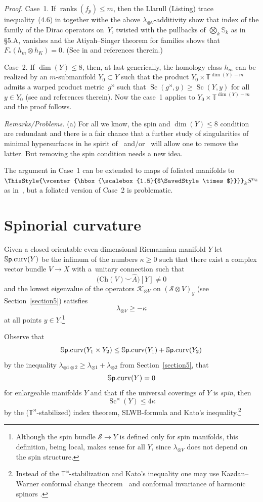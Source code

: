 \documentclass[10pt,a4paper]{amsart}
\numberwithin{equation}{section}
\newcommand\bigtimes{\mathbin{\ThisStyle{\vcenter{\hbox{%
\scalebox{1.5}{$\SavedStyle\times$}}}}}}
\begin{document}
 {\it Proof.} Case~1. If $\operatorname{ranks}(f_p)\leq m$, then the Llarull (Listing) trace inequality~(4.6) in \cite{Ll1998} together withe the above $\lambda_{\otimes V}$-additivity show that index of the family of the Dirac operators on~$Y$, twisted with the pullbacks of $\bigotimes_k \mathbb S_k$ as in \S5.A, vanishes and the Atiyah--Singer theorem for families shows that $F_\ast(h_m\otimes h_K)=0$. (See in \cite[\S4]{Gr2021} and references therein.)

 Case~2. If $\dim(Y)\leq 8$, then, at last generically, the homology class
 $h_m$ can be realized by an $m$-submanifold $Y_0\subset Y $ such that the product $Y_0\times \mathbb T^{\dim(Y)-m}$ admits a warped product metric~$g^\rtimes $ such that $\operatorname{Sc} (g^\rtimes, y)\geq \operatorname{Sc} (Y,y)$
 for all $y\in Y_0$ (see \cite[\S3]{Gr2023} and references therein).
 Now the case~1 applies to $Y_0\times \mathbb T^{\dim(Y)-m}$ and the proof follows.


{\it Remarks/Problems.} (a) For all we know, the spin and $\dim(Y)\leq 8$ condition are redundant and there is a fair chance that a further study of singularities of minimal hypersurfaces in he spirit of~\cite{SY2017} and/or~\cite{Lo2018,Lo2018a} will allow one to remove the latter. But removing the spin condition needs a new idea.

The argument in Case~1 can be extended to maps of foliated manifolds to $\bigtimes_k S^{n_k}$ as in~\cite{SWZ2021}, but a foliated version of Case~2 is problematic.

\section{Spinorial curvature}\label{section7}

Given a closed orientable even dimensional Riemannian manifold $Y$ let
$\mathbb S{\sf p}.\mathrm{curv}(Y)$ be the infimum of the numbers $\kappa\geq 0$ such that
there exist
a complex vector bundle $V\to X$ with a~unitary connection such that
\[
\bigl(\mathrm{Ch}(V)\smile \hat A\bigr)[Y]\neq 0
\]
 and
 the lowest eigenvalue of the operators $\mathcal K_{\otimes V}$ on $(\mathcal S\otimes V)_y$ (see Section~\ref{section5}) satisfies
\[
\lambda_{\otimes V}\geq -\kappa
\]
 at all points $y\in Y$.\footnote{Although the spin bundle $\mathcal S\to Y$ is defined only for spin manifolds, this
definition, being local, makes sense for all $Y$, since $\lambda_{\otimes V}$ does not depend on the spin structure.}

Observe that
\[
\mathbb S\mbox{\sf p}.{\rm curv}(Y_1\times Y_2)\leq \mathbb S\mbox{\sf p}.{\rm curv}(Y_1)+ \mathbb S\mbox{\sf p}.{\rm curv}( Y_2)
\]
 by
the inequality $\lambda_{\otimes 1\otimes 2}\geq \lambda_{\otimes 1}+\lambda_{\otimes 2} $
from Section~\ref{section5},
 that
\[
\mathbb S\mbox{\sf p}.{\rm curv}(Y)=0
\]
for enlargeable manifolds $Y$
and that if the universal coverings of $Y$ is {\it spin}, then
\[
\operatorname{Sc}^\rtimes(Y)\leq 4\kappa
\]
by the ($\mathbb T^\rtimes$-stabilized) index theorem, SLWB-formula and Kato's inequality.\footnote{Instead of the $\mathbb T^\rtimes$-stabilization and Kato's inequality one may use Kazdan--Warner conformal change theorem~\cite{KW1975} and conformal invariance of harmonic spinors \cite{Hi1974}.}
\end{document}
